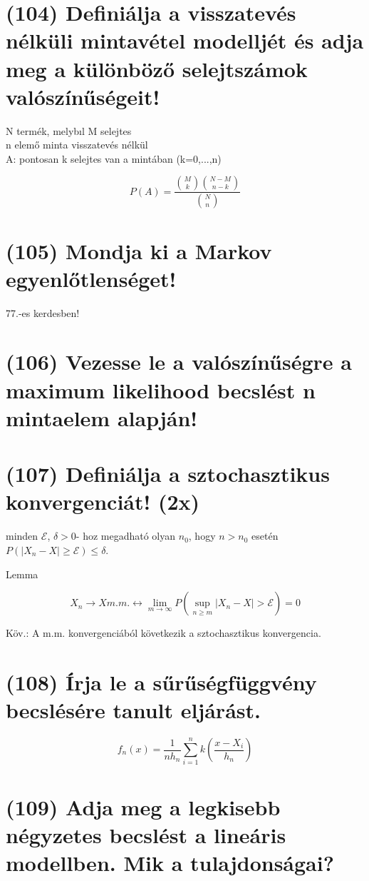 \documentclass[12p]{article}
\begin{document}
\section{(104)  Definiálja a visszatevés nélküli mintavétel modelljét és adja meg a különböző selejtszámok valószínűségeit!}

N termék, melybıl M selejtes\\
n elemő minta visszatevés nélkül\\
A: pontosan k selejtes van a mintában
(k=0,...,n)

$$P(A) = \frac{{M \choose k}{{N - M} \choose {n - k}}}{{N \choose n}}$$

\section{(105) Mondja ki a Markov egyenlőtlenséget!}

77.-es kerdesben!

\section{(106) Vezesse le a valószínűségre a maximum likelihood becslést n mintaelem alapján!}

\section{(107) Definiálja a sztochasztikus konvergenciát! (2x)}

 minden $\mathcal{E}$, $\delta>0$-
hoz megadható olyan $n_0$, hogy $n>n_0$ esetén $P(|X_n-X| \geq \mathcal{E}) \leq \delta$.

Lemma

$$X_n \rightarrow X m.m. \leftrightarrow \lim_{m \rightarrow \infty} P(\sup_{n \geq m} |X_n - X| > \mathcal{E}) = 0$$

Köv.: A m.m. konvergenciából következik a
sztochasztikus konvergencia.


\section{(108) Írja le a sűrűségfüggvény becslésére tanult eljárást.}

$$f_n(x) = \frac{1}{nh_n}\sum^n_{i=1}k\left( \frac{x-X_i}{h_n} \right)$$

\section{(109) Adja meg a legkisebb négyzetes becslést a lineáris modellben. Mik a tulajdonságai?}
\end{document}
